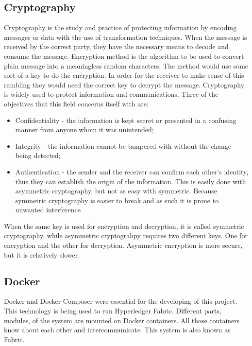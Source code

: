 \documentclass[a4paper,11pt]{report}
\begin{document}
\subsection{Cryptography}
Cryptography is the study and practice of protecting information by encoding messages or data with the use of transformation techniques. When the message is received by the correct party, they have the necessary means to decode and consume the message. 
	Encryption method is the algorithm to be used to convert plain message into a meaningless random characters. The method would use some sort of a key to do the encryption. In order for the receiver to make sense of this rambling they would need the correct key to decrypt the message.\cite{cryptolecture} Cryptography is widely used to protect information and communications. Three of the objectives that this field concerns itself with are: 
\begin{itemize}

\item Confidentiality - the information is kept secret or presented in a confusing manner from anyone whom it was unintended; 
\item Integrity - the information cannot be tampered with without the change being detected;
\item Authentication - the sender and the receiver can confirm each other’s identity, thus they can establish the origin of the information. This is easily done with asymmetric cryptography, but not as easy with symmetric. Because symmetric cryptography is easier to break and as such it is prone to unwanted interference
\end{itemize}

When the same key is used for encryption and decryption, it is called symmetric cryptography, while asymmetric cryptograhpy requires two different keys. One for encryption and the other for decryption. Asymmetric encryption is more secure, but it is relatively slower. \cite{symasym}


\subsection{Docker}
\label{docker}
Docker and Docker Composer were essential for the developing of this project. This technology is being used to run Hyperledger Fabric. Different parts, modules, of the system are mounted on Docker containers. All those containers know about each other and intercommunicate. This system is also known as Fabric.
\end{document}
